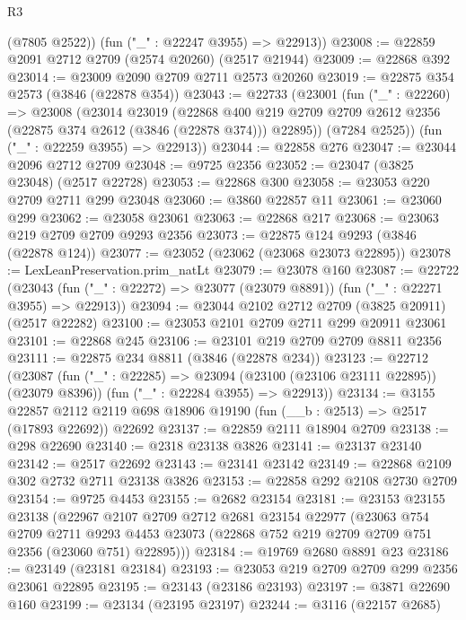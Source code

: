 \begin{lexlean}{R3}
\begin{coremodule}
        (@7805 @2522))
      (fun ("_" : @22247 @3955) => @22913))
@23008 := @22859 @2091 @2712 @2709 (@2574 @20260) (@2517 @21944)
@23009 := @22868 @392
@23014 := @23009 @2090 @2709 @2711 @2573 @20260
@23019 := @22875 @354 @2573 (@3846 (@22878 @354))
@23043 := @22733
    (@23001
      (fun ("_" : @22260) =>
      @23008
        (@23014
          @23019
          (@22868
            @400
            @219
            @2709
            @2709
            @2612
            @2356
            (@22875 @374 @2612 (@3846 (@22878 @374)))
            @22895))
        (@7284 @2525))
      (fun ("_" : @22259 @3955) => @22913))
@23044 := @22858 @276
@23047 := @23044 @2096 @2712 @2709
@23048 := @9725 @2356
@23052 := @23047 (@3825 @23048) (@2517 @22728)
@23053 := @22868 @300
@23058 := @23053 @220 @2709 @2711 @299 @23048
@23060 := @3860 @22857 @11
@23061 := @23060 @299
@23062 := @23058 @23061
@23063 := @22868 @217
@23068 := @23063 @219 @2709 @2709 @9293 @2356
@23073 := @22875 @124 @9293 (@3846 (@22878 @124))
@23077 := @23052 (@23062 (@23068 @23073 @22895))
@23078 := LexLeanPreservation.prim_natLt
@23079 := @23078 @160
@23087 := @22722
    (@23043 (fun ("_" : @22272) => @23077 (@23079 @8891)) (fun ("_" : @22271 @3955) => @22913))
@23094 := @23044 @2102 @2712 @2709 (@3825 @20911) (@2517 @22282)
@23100 := @23053 @2101 @2709 @2711 @299 @20911 @23061
@23101 := @22868 @245
@23106 := @23101 @219 @2709 @2709 @8811 @2356
@23111 := @22875 @234 @8811 (@3846 (@22878 @234))
@23123 := @22712
    (@23087
      (fun ("_" : @22285) => @23094 (@23100 (@23106 @23111 @22895)) (@23079 @8396))
      (fun ("_" : @22284 @3955) => @22913))
@23134 := @3155
    @22857
    @2112
    @2119
    @698
    @18906
    @19190
    (fun (__b : @2513) => @2517 (@17893 @22692))
    @22692
@23137 := @22859 @2111 @18904 @2709
@23138 := @298 @22690
@23140 := @2318 @23138 @3826
@23141 := @23137 @23140
@23142 := @2517 @22692
@23143 := @23141 @23142
@23149 := @22868 @2109 @302 @2732 @2711 @23138 @3826
@23153 := @22858 @292 @2108 @2730 @2709
@23154 := @9725 @4453
@23155 := @2682 @23154
@23181 := @23153
    @23155
    @23138
    (@22967
      @2107
      @2709
      @2712
      @2681
      @23154
      @22977
      (@23063
        @754
        @2709
        @2711
        @9293
        @4453
        @23073
        (@22868 @752 @219 @2709 @2709 @751 @2356 (@23060 @751) @22895)))
@23184 := @19769 @2680 @8891 @23
@23186 := @23149 (@23181 @23184)
@23193 := @23053 @219 @2709 @2709 @299 @2356 @23061 @22895
@23195 := @23143 (@23186 @23193)
@23197 := @3871 @22690 @160
@23199 := @23134 (@23195 @23197)
@23244 := @3116
    (@22157 @2685)

\end{coremodule}
\end{lexlean}
